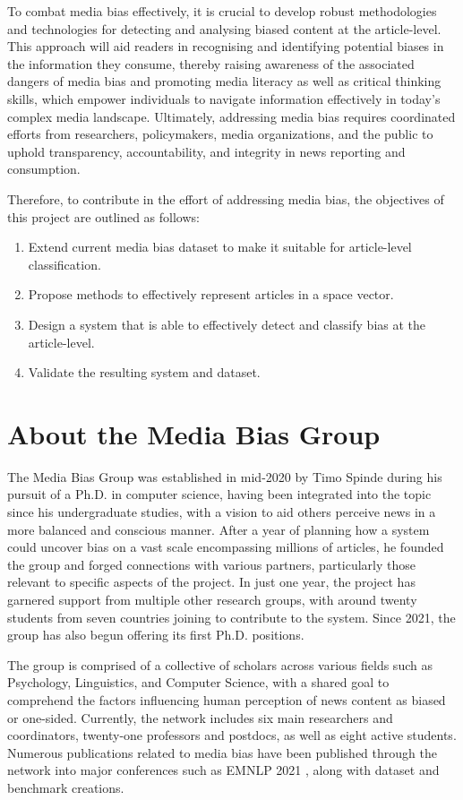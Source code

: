 To combat media bias effectively, it is crucial to develop robust methodologies and technologies for detecting and analysing biased content at the article-level. This approach will aid readers in recognising and identifying potential biases in the information they consume, thereby raising awareness of the associated dangers of media bias and promoting media literacy as well as critical thinking skills, which empower individuals to navigate information effectively in today's complex media landscape. Ultimately, addressing media bias requires coordinated efforts from researchers, policymakers, media organizations, and the public to uphold transparency, accountability, and integrity in news reporting and consumption.

Therefore, to contribute in the effort of addressing media bias, the objectives of this project are outlined as follows:
\begin{enumerate}
    \item Extend current media bias dataset to make it suitable for article-level classification.
    \item Propose methods to effectively represent articles in a space vector.
    \item Design a system that is able to effectively detect and classify bias at the article-level.
    \item Validate the resulting system and dataset.
\end{enumerate}

\section{About the Media Bias Group}

The Media Bias Group \cite{media-bias-group} was established in mid-2020 by Timo Spinde during his pursuit of a Ph.D. in computer science, having been integrated into the topic since his undergraduate studies, with a vision to aid others perceive news in a more balanced and conscious manner. After a year of planning how a system could uncover bias on a vast scale encompassing millions of articles, he founded the group and forged connections with various partners, particularly those relevant to specific aspects of the project. In just one year, the project has garnered support from multiple other research groups, with around twenty students from seven countries joining to contribute to the system. Since 2021, the group has also begun offering its first Ph.D. positions.

The group is comprised of a collective of scholars across various fields such as Psychology, Linguistics, and Computer Science, with a shared goal to comprehend the factors influencing human perception of news content as biased or one-sided. Currently, the network includes six main researchers and coordinators, twenty-one professors and postdocs, as well as eight active students. Numerous publications related to media bias have been published through the network into major conferences such as EMNLP 2021 \cite{spinde-2021-babe}, along with dataset and benchmark creations.


